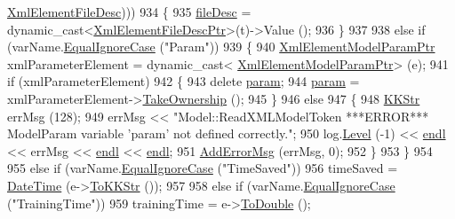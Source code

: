 \begin{DoxyCode}
      \hyperlink{class_k_k_m_l_l_1_1_xml_element_file_desc}{XmlElementFileDesc})))
934     \{
935       \hyperlink{class_k_k_m_l_l_1_1_model_a65c48cd3601efe64e1431beba55e24f4}{fileDesc} = \textcolor{keyword}{dynamic\_cast<}\hyperlink{class_k_k_m_l_l_1_1_xml_element_file_desc}{XmlElementFileDescPtr}\textcolor{keyword}{>}(t)->Value ();
936     \}
937 
938     \textcolor{keywordflow}{else} \textcolor{keywordflow}{if}  (varName.\hyperlink{class_k_k_b_1_1_k_k_str_a562f9696417c53f66bc4088eac072ab5}{EqualIgnoreCase} (\textcolor{stringliteral}{"Param"})) 
939     \{
940       \hyperlink{class_k_k_m_l_l_1_1_xml_element_model_param}{XmlElementModelParamPtr}  xmlParameterElement = \textcolor{keyword}{dynamic\_cast<}
      \hyperlink{class_k_k_m_l_l_1_1_xml_element_model_param}{XmlElementModelParamPtr}\textcolor{keyword}{>} (e);
941       \textcolor{keywordflow}{if}  (xmlParameterElement)
942       \{
943         \textcolor{keyword}{delete} \hyperlink{class_k_k_m_l_l_1_1_model_a46bd4d1b3ab8d3d9847c1b00b7c0b66f}{param};
944         \hyperlink{class_k_k_m_l_l_1_1_model_a46bd4d1b3ab8d3d9847c1b00b7c0b66f}{param} = xmlParameterElement->\hyperlink{class_k_k_m_l_l_1_1_xml_element_model_param_adea7f8baf74a48f181962fa32041c64a}{TakeOwnership} ();
945       \}
946       \textcolor{keywordflow}{else}
947       \{
948         \hyperlink{class_k_k_b_1_1_k_k_str}{KKStr} errMsg (128);
949         errMsg << \textcolor{stringliteral}{"Model::ReadXMLModelToken   ***ERROR***   ModelParam variable 'param' not defined
       correctly."};
950         log.\hyperlink{class_k_k_b_1_1_run_log_a32cf761d7f2e747465fd80533fdbb659}{Level} (-1) << \hyperlink{namespace_k_k_b_ad1f50f65af6adc8fa9e6f62d007818a8}{endl} << errMsg << \hyperlink{namespace_k_k_b_ad1f50f65af6adc8fa9e6f62d007818a8}{endl} << \hyperlink{namespace_k_k_b_ad1f50f65af6adc8fa9e6f62d007818a8}{endl};
951         \hyperlink{class_k_k_m_l_l_1_1_model_adb50e734c8b33aff714bc2071b4800bb}{AddErrorMsg} (errMsg, 0);
952       \}
953     \}
954 
955     \textcolor{keywordflow}{else} \textcolor{keywordflow}{if}  (varName.\hyperlink{class_k_k_b_1_1_k_k_str_a562f9696417c53f66bc4088eac072ab5}{EqualIgnoreCase} (\textcolor{stringliteral}{"TimeSaved"}))
956       timeSaved = \hyperlink{class_k_k_b_1_1_date_time}{DateTime} (e->\hyperlink{class_k_k_b_1_1_xml_element_a3028fc03b79509e6378749f6a8b426b9}{ToKKStr} ());
957 
958     \textcolor{keywordflow}{else} \textcolor{keywordflow}{if}  (varName.\hyperlink{class_k_k_b_1_1_k_k_str_a562f9696417c53f66bc4088eac072ab5}{EqualIgnoreCase} (\textcolor{stringliteral}{"TrainingTime"}))
959       trainingTime = e->\hyperlink{class_k_k_b_1_1_xml_element_ac32778396ab8bdb215ad38f2f33f05de}{ToDouble} ();

\end{DoxyCode}
